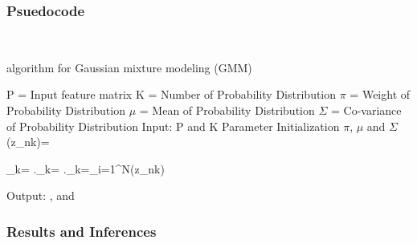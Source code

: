 \documentclass{article}
\begin{document}
\subsubsection {\color{brown}
\textbf{Psuedocode}} \\ 
\begin{algorithm}

        \caption{algorithm for Gaussian mixture modeling (GMM)}
        \begin{algorithmic}
            \STATE P = Input feature matrix 
            \STATE K = Number of Probability Distribution 
            \STATE $\pi$ = Weight of Probability Distribution 
            \STATE $\mu$ = Mean of Probability Distribution
            \STATE $\Sigma$ = Co-variance of Probability Distribution
            \STATE Input: P and K
            \STATE Parameter Initialization $\pi$, $\mu$ and $\Sigma$
                         \hspace{1cm}\gamma(z_{nk})=
                    
                        \ENDFOR
                    \ENDFOR
                    \STATE
                    {  
                         \hspace{1cm}\mu_k=
                         \newline
                          .\hspace{1cm}\Sigma_k=
                          \newline
                          .\hspace{1cm}\pi_k=\sum_{i=1}^{N}\gamma(z_{nk})
                    
                        \ENDFOR
                    }
                   \ENDFOR
                    \newline
                   Output: \pi, \mu and \Sigma
        \end{algorithmic}
    \end{algorithm}

\newpage
\subsubsection {\color{brown}
\textbf{Results and Inferences}} \\ 
\end{document}
